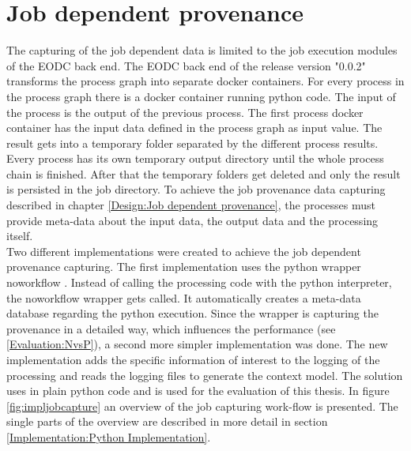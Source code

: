 \documentclass[draft,final]{vutinfth} %
\begin{document}
\section{Job dependent provenance}\label{Implementation:Job dependent provenance}
The capturing of the job dependent data is limited to the job execution modules of the EODC back end. The EODC back end of the release version "0.0.2" transforms the process graph into separate docker containers. For every process in the process graph there is a docker container running python code. The input of the process is the output of the previous process. The first process docker container has the input data defined in the process graph as input value. The result gets into a temporary folder separated by the different process results. Every process has its own temporary output directory until the whole process chain is finished. After that the temporary folders get deleted and only the result is persisted in the job directory.
To achieve the job provenance data capturing described in chapter \ref{Design:Job dependent provenance}, the processes must provide meta-data about the input data, the output data and the processing itself. \\ 
Two different implementations were created to achieve the job dependent provenance capturing. The first implementation uses the python wrapper noworkflow \cite{c9e0604becba42af96a9cb0a6f60018b}. Instead of calling the processing code with the python interpreter, the noworkflow wrapper gets called. It automatically creates a meta-data database regarding the python execution. Since the wrapper is capturing the provenance in a detailed way, which influences the performance (see \ref{Evaluation:NvsP}), a second more simpler implementation was done. The new implementation adds the specific information of interest to the logging of the processing and reads the logging files to generate the context model. The solution uses in plain python code and is used for the evaluation of this thesis. In figure \ref{fig:impljobcapture} an overview of the job capturing work-flow is presented. The single parts of the overview are described in more detail in section \ref{Implementation:Python Implementation}.  
\end{document}
